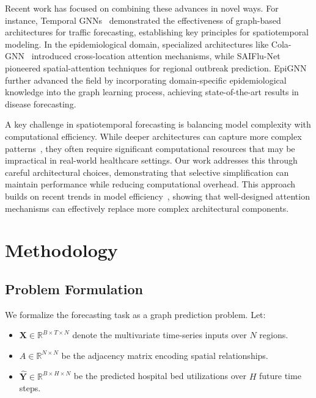 \documentclass[lettersize, journal]{IEEEtran}
\begin{document}
Recent work has focused on combining these advances in novel ways. For instance, Temporal GNNs~\cite{temporal_gnn} demonstrated the effectiveness of graph-based architectures for traffic forecasting, establishing key principles for spatiotemporal modeling. In the epidemiological domain, specialized architectures like Cola-GNN~\cite{cola_gnn} introduced cross-location attention mechanisms, while SAIFlu-Net~\cite{saiflu_net} pioneered spatial-attention techniques for regional outbreak prediction. EpiGNN~\cite{epignn} further advanced the field by incorporating domain-specific epidemiological knowledge into the graph learning process, achieving state-of-the-art results in disease forecasting.

A key challenge in spatiotemporal forecasting is balancing model complexity with computational efficiency. While deeper architectures can capture more complex patterns~\cite{gnn_survey}, they often require significant computational resources that may be impractical in real-world healthcare settings. Our work addresses this through careful architectural choices, demonstrating that selective simplification can maintain performance while reducing computational overhead. This approach builds on recent trends in model efficiency~\cite{attention_mechanisms}, showing that well-designed attention mechanisms can effectively replace more complex architectural components.

\section{Methodology}
\label{sec:methodology}

\subsection{Problem Formulation}
We formalize the forecasting task as a graph prediction problem. Let:
\begin{itemize}[leftmargin=*]
\item $\mathbf{X} \in \mathbb{R}^{B \times T \times N}$ denote the multivariate time-series inputs over $N$ regions.
\item $A \in \mathbb{R}^{N \times N}$ be the adjacency matrix encoding spatial relationships.
\item $\hat{\mathbf{Y}} \in \mathbb{R}^{B \times H \times N}$ be the predicted hospital bed utilizations over $H$ future time steps.
\end{itemize}
\end{document}
